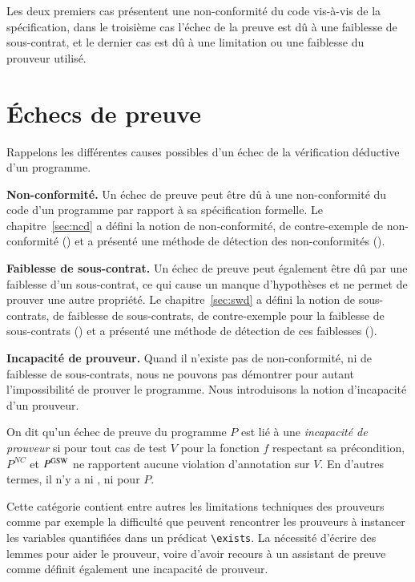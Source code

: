 Les deux premiers cas présentent une non-conformité du code vis-à-vis de
la spécification, dans le troisième cas l'échec de la preuve est dû à une
faiblesse de sous-contrat, et le dernier cas est dû à une limitation ou une
faiblesse du prouveur utilisé.


\section{Échecs de preuve}
\label{sec:method-proof-failures}


Rappelons les différentes causes possibles d'un échec de la vérification
déductive d'un programme.

\textbf{Non-conformité.}
Un échec de preuve peut être dû à une non-conformité du code d'un programme par
rapport à sa spécification formelle.
Le chapitre~\ref{sec:ncd} a défini la notion de non-conformité, de
contre-exemple de non-conformité (\NCCE) et a présenté une méthode de détection
des non-conformités (\NCD).

\textbf{Faiblesse de sous-contrat.}
Un échec de preuve peut également être dû par une faiblesse d'un
sous-contrat, ce qui cause un manque d'hypothèses et ne permet de prouver une
autre propriété.
Le chapitre~\ref{sec:swd} a défini la notion de sous-contrats, de faiblesse de
sous-contrats, de contre-exemple pour la faiblesse de sous-contrats (\SWCE) et
a présenté une méthode de détection de ces faiblesses (\SWD).

\textbf{Incapacité de prouveur.}
Quand il n'existe pas de non-conformité, ni de faiblesse de sous-contrats, nous
ne pouvons pas démontrer pour autant l'impossibilité de prouver le programme.
Nous introduisons la notion d'incapacité d'un prouveur.

\begin{definition}
\label{def:prov-incap}
On dit qu'un échec de preuve du programme $P$ est lié à une
\emph{incapacité de prouveur} si pour tout cas de test $V$ pour la fonction $f$
respectant sa précondition, $P^{NC}$ et $P^{\mathrm{GSW}}$ ne rapportent aucune violation
d'annotation sur $V$.
En d'autres termes, il n'y a ni \NCCE, ni \GSWCE pour $P$.
\end{definition}

Cette catégorie contient entre autres les limitations techniques des prouveurs
comme par exemple la difficulté que peuvent rencontrer les prouveurs à
instancer les variables quantifiées dans un prédicat \lstinline'\exists'.
La nécessité d'écrire des lemmes pour aider le prouveur, voire d'avoir recours
à un assistant de preuve comme \coq définit également une incapacité de
prouveur.


